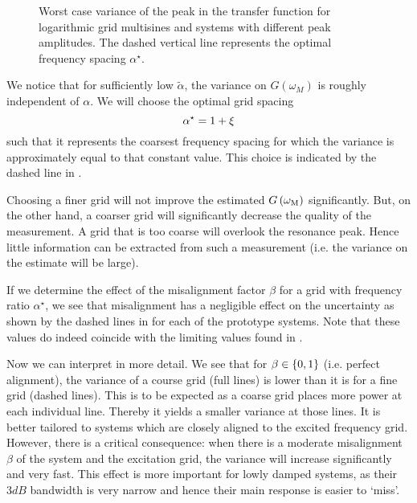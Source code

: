   \begin{figure}[ht]
    \centering
      \setlength\figureheight{5cm}
      \setlength{}
    
    \caption[Worst-case variance $\sigma_G^2\left( \wM \right)$ as a function of the frequency ratio $\alpha$.]{Worst case variance of the peak in the transfer function for logarithmic
             grid multisines and systems with different peak amplitudes.
             The dashed vertical line represents the optimal frequency spacing $\alpha^{\star}$.}
    \label{fig:worstCaseAlpha}
  \end{figure}

  We notice that for sufficiently low $\tilde{\alpha}$, the variance on $G\left( \omega_M \right)$ is roughly independent of $\alpha$.
  We will choose the optimal grid spacing
  \begin{equation}
    \alpha^{\star} = 1 + \xi
    \label{eq:optimAlpha}
  \end{equation}
  such that it represents the coarsest frequency spacing for which the variance is approximately equal to that constant value.
  This choice is indicated by the dashed line in .

  Choosing a finer grid will not improve the estimated $G\left( \omega_{\mathrm{M}} \right)$ significantly.
  But, on the other hand, a coarser grid will significantly decrease the quality of the measurement.
  A grid that is too coarse will overlook the resonance peak.
  Hence little information can be extracted from such a measurement (i.e. the variance on the estimate will be large).

  If we determine the effect of the misalignment factor $\beta$ for a grid with frequency ratio $\alpha^{\star}$, we see that misalignment has a negligible effect on the uncertainty as shown by the dashed lines in  for each of the prototype systems.
  Note that these values do indeed coincide with the limiting values found in .
  
  Now we can interpret  in more detail.
  We see that for $\beta \in \left\{0,1\right\}$ (i.e. perfect alignment), the variance of a course grid (full lines) is lower than it is for a fine grid (dashed lines).
  This is to be expected as a coarse grid places more power at each individual line.
  Thereby it yields a smaller variance at those lines.
  It is better tailored to systems which are closely aligned to the excited frequency grid.
  However, there is a critical consequence: when there is a moderate misalignment $\beta$ of the system and the excitation grid, the variance will increase significantly and very fast.
  This effect is more important for lowly damped systems, as their $3\unit{dB}$ bandwidth is very narrow and hence their main response is easier to `miss'.

